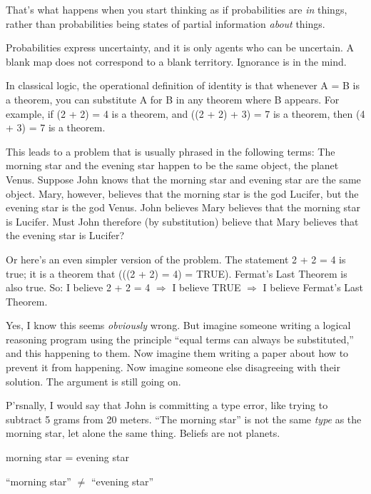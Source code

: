 {
 That's what happens when you start thinking as if
probabilities are \textit{in} things, rather than probabilities being
states of partial information \textit{about} things.}

{
 Probabilities express uncertainty, and it is only agents who can
be uncertain. A blank map does not correspond to a blank territory.
Ignorance is in the mind.}

\myendsectiontext


{
 In classical logic, the operational definition of identity is that
whenever A = B is a theorem, you can substitute A for B in any theorem
where B appears. For example, if (2 + 2) = 4 is a theorem, and ((2 + 2)
+ 3) = 7 is a theorem, then (4 + 3) = 7 is a theorem. }

{
 This leads to a problem that is usually phrased in the following
terms: The morning star and the evening star happen to be the same
object, the planet Venus. Suppose John knows that the morning star and
evening star are the same object. Mary, however, believes that the
morning star is the god Lucifer, but the evening star is the god Venus.
John believes Mary believes that the morning star is Lucifer. Must John
therefore (by substitution) believe that Mary believes that the evening
star is Lucifer?}

{
 Or here's an even simpler version of the problem.
The statement 2 + 2 = 4 is true; it is a theorem that (((2 + 2) = 4) =
TRUE). Fermat's Last Theorem is also true. So: I
believe 2 + 2 = 4 $\Rightarrow $ I believe TRUE $\Rightarrow $ I
believe Fermat's Last Theorem.}

{
 Yes, I know this seems \textit{obviously} wrong. But imagine
someone writing a logical reasoning program using the principle
``equal terms can always be
substituted,'' and this happening to them. Now
imagine them writing a paper about how to prevent it from happening.
Now imagine someone else disagreeing with their solution. The argument
is still going on.}

{
 P'rsnally, I would say that John is committing a
type error, like trying to subtract 5 grams from 20 meters.
``The morning star'' is not the same
\textit{type} as the morning star, let alone the same thing. Beliefs
are not planets.}

{\centering
 morning star = evening star
\par}


\bigskip

{\centering
 ``morning star'' ${\neq}$
``evening star''
\par}


